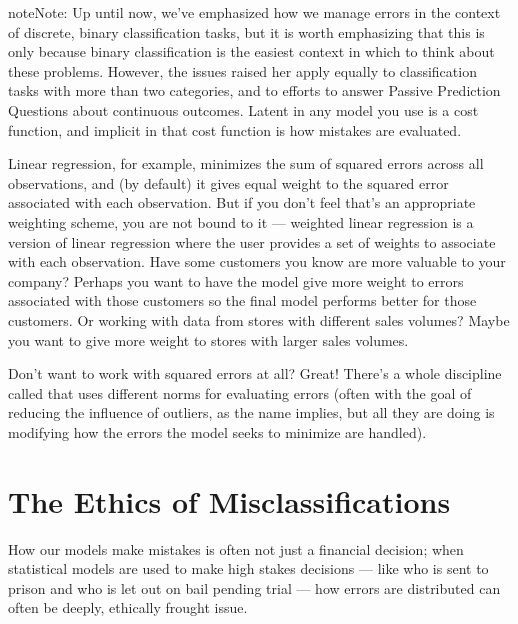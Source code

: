 \documentclass[letterpaper,10pt,english]{jupyterBook}
\begin{document}
\begin{sphinxadmonition}{note}{Note:}
\sphinxAtStartPar
Up until now, we’ve emphasized how we manage errors in the context of discrete, binary classification tasks, but it is worth emphasizing that this is only because binary classification is the easiest context in which to think about these problems. However, the issues raised her apply equally to classification tasks with more than two categories, and to efforts to answer Passive Prediction Questions about continuous outcomes. Latent in any model you use is a cost function, and implicit in that cost function is how mistakes are evaluated.

\sphinxAtStartPar
Linear regression, for example, minimizes the sum of squared errors across all observations, and (by default) it gives equal weight to the squared error associated with each observation. But if you don’t feel that’s an appropriate weighting scheme, you are not bound to it — weighted linear regression is a version of linear regression where the user provides a set of weights to associate with each observation. Have some customers you know are more valuable to your company? Perhaps you want to have the model give more weight to errors associated with those customers so the final model performs better for those customers. Or working with data from stores with different sales volumes? Maybe you want to give more weight to stores with larger sales volumes.

\sphinxAtStartPar
Don’t want to work with squared errors at all? Great! There’s a whole discipline called  that uses different norms for evaluating errors (often with the goal of reducing the influence of outliers, as the name implies, but all they are doing is modifying how the errors the model seeks to minimize are handled).
\end{sphinxadmonition}


\section{The Ethics of Misclassifications}
\label{\detokenize{30_questions/26_passive_prediction_errors:the-ethics-of-misclassifications}}
\sphinxAtStartPar
How our models make mistakes is often not just a financial decision; when statistical models are used to make high stakes decisions — like who is sent to prison and who is let out on bail pending trial — how errors are distributed can often be deeply,  ethically frought issue.
\end{document}
